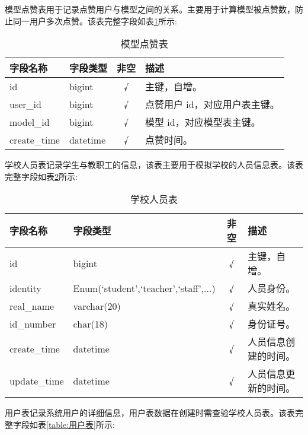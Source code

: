 模型点赞表用于记录点赞用户与模型之间的关系。主要用于计算模型被点赞数，防止同一用户多次点赞。该表完整字段如表\ref{table:模型点赞表}所示:

\begin{table}[H]
  \centering
  \small
  \caption{模型点赞表}
  \label{table:模型点赞表}
  \setlength{\tabcolsep}{9mm}
  \begin{tabular}{l|l|c|l}
    \toprule
    \textbf{字段名称} & \textbf{字段类型} & \textbf{非空} & \textbf{描述} \\
    \midrule
    id & bigint & √ & 主键，自增。 \\
    user\_id & bigint & √ & 点赞用户 id，对应用户表主键。 \\
    model\_id & bigint & √ & 模型 id，对应模型表主键。 \\
    create\_time & datetime & √ & 点赞时间。 \\
    \bottomrule
  \end{tabular}
\end{table}

学校人员表记录学生与教职工的信息，该表主要用于模拟学校的人员信息表。该表完整字段如表\ref{table:学校人员表}所示:

\begin{table}[H]
  \centering
  \small
  \caption{学校人员表}
  \label{table:学校人员表}
  \setlength{\tabcolsep}{6mm}
  \begin{tabular}{l|l|c|l}
    \toprule
    \textbf{字段名称} & \textbf{字段类型} & \textbf{非空} & \textbf{描述} \\
    \midrule
    id & bigint & √ & 主键，自增。 \\
    identity & Enum(`student',`teacher',`staff',...) & √ & 人员身份。 \\
    real\_name & varchar(20) & √ & 真实姓名。 \\
    id\_number & char(18) & √ & 身份证号。 \\
    create\_time & datetime & √ & 人员信息创建的时间。 \\
    update\_time & datetime & √ & 人员信息更新的时间。 \\
    \bottomrule
  \end{tabular}
\end{table}

用户表记录系统用户的详细信息，用户表数据在创建时需查验学校人员表。该表完整字段如表\ref{table:用户表}所示:

